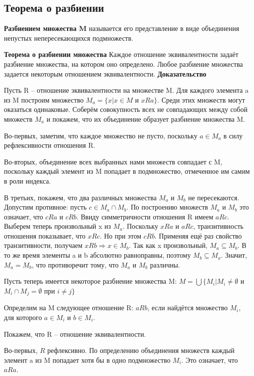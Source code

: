 \documentclass[a4paper]{article}
\begin{document}
{\begin{small}
\section*{Теорема о разбиении}
\textbf{Разбиением множества M} называется его представление в виде объединения непустых непересекающихся подмножеств.

\textbf{Теорема о разбиении множества} 
Каждое отношение эквивалентности
задаёт разбиение множества, на котором оно определено. Любое разбиение множества задается некоторым отношением эквивалентности.
\textbf{Доказательство}

Пусть R –
отношение эквивалентности на множестве M. Для каждого элемента a из M построим множество $M_a = \{x | x \in M$ и $x R a\}$. Среди этих множеств могут
оказаться одинаковые. Соберём совокупность всех не совпадающих между
собой множеств $M_a$ и покажем, что их объединение образует разбиение множества M. 

Во-первых, заметим, что каждое множество не пусто, поскольку $a \in M_a$ в
силу рефлексивности отношения R.

Во-вторых, объединение всех выбранных нами множеств совпадает с M,
поскольку каждый элемент из M попадает в подмножество, отмеченное им
самим в роли индекса.

В третьих, покажем, что два различных множества $M_a$ и $M_b$ не пересекаются.
Допустим противное: пусть $c \in M_a \cap M_b$. По построению множеств $M_a$ и $M_b$ это
означает, что $c R a$ и $c R b$. Ввиду симметричности отношения R имеем $a R c$.
Выберем теперь произвольный x из $M_a$. Поскольку $x R a$ и $a R c$, транзитивность
отношения показывает, что $x R c$. Но при этом $c R b$. Применяя ещё раз свойство
транзитивности, получаем $x R b \Rightarrow x \in M_b$. Так как x произвольный, $M_a \subseteq M_b$. В то же время элементы a и b абсолютно
равноправны, поэтому $M_b \subseteq M_a$. Значит, $M_a = M_b$, что противоречит тому, что $M_a$ и $M_b$ различны.

Пусть теперь имеется некоторое разбиение множества M:
$M = \bigcup \{ M_i | M_i \neq \emptyset$ и $M_i \cap M_j = \emptyset$ при $i \neq j\}$

Определим на M следующее отношение R: $aRb$, если найдётся множество $M_i$, для которого $a \in M_i$ и $b \in M_i$.

Покажем, что R – отношение эквивалентности.

Во-первых, $R$ рефлексивно. По определению объединения множеств каждый
элемент a из M попадает хотя бы в одно подмножество $M_i$. Это означает, что
$aRa$.


\end{small}}
\end{document}
